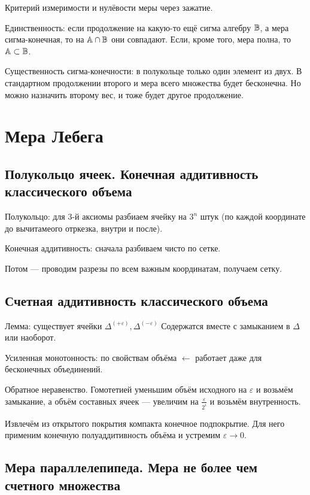 \documentclass[12pt, a4paper, oneside]{memoir}
\begin{document}
Критерий измеримости и нулёвости меры через зажатие.

Единственность: если продолжение на какую-то ещё сигма алгебру ${\mathbb{B}}$,
а мера сигма-конечная, то на ${\mathbb{A}} \cap {\mathbb{B}}$ они совпадают.
Если, кроме того, мера полна, то ${\mathbb{A}} \subset {\mathbb{B}}$.


Существенность сигма-конечности:
в полукольце только один элемент из двух.
В стандартном продолжении второго и мера всего множества будет бесконечна.
Но можно назначить второму вес, и тоже будет другое продолжение.


\section{Мера Лебега}

\subsection{Полукольцо ячеек. Конечная аддитивность классического объема}

Полукольцо: для 3-й аксиомы разбиаем ячейку на $3^n$ штук (по каждой координате до вычитамеого отркезка, внутри и после).

Конечная аддитивность: сначала разбиваем чисто по сетке.

Потом — проводим разрезы по всем важным координатам, получаем сетку.


\subsection{Счетная аддитивность классического объема}

Лемма: существует ячейки $\Delta^{(+\varepsilon)}, \Delta^{(-\varepsilon)}$
Содержатся вместе с замыканием в $\Delta$ или наоборот.


Усиленная монотонность: по свойствам объёма $←$ работает даже для бесконечных объединений.

Обратное неравенство. Гомотетией уменьшим объём исходного на $\varepsilon$ и возьмём замыкание,
а объём составных ячеек — увеличим на $\frac{\varepsilon}{2^i}$ и возьмём внутренность.

Извлечём из открытого покрытия компакта конечное подпокрытие.
Для него применим конечную полуаддитивность объёма и устремим $\varepsilon → 0$.


\subsection{Мера параллелепипеда. Мера не более чем счетного множества}
\end{document}
